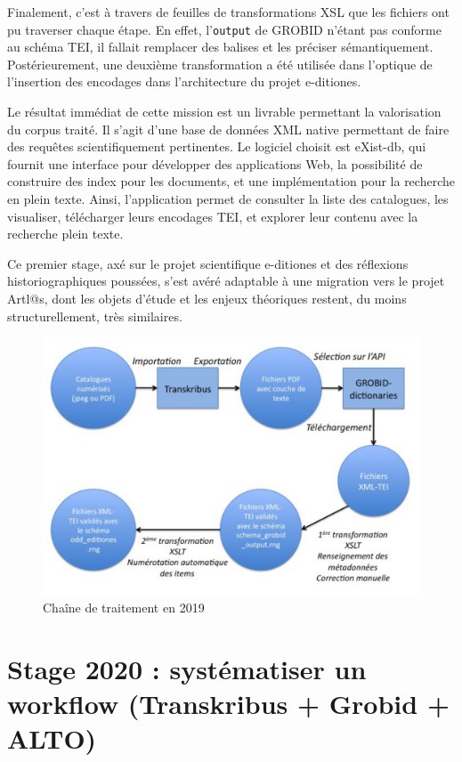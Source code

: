 \documentclass[a4paper,12pt,twoside]{book}
\begin{document}
Finalement, c'est à travers de feuilles de transformations XSL que les fichiers ont pu traverser chaque étape. En effet, l'\texttt{output} de GROBID n'étant pas conforme au schéma TEI, il fallait remplacer des balises et les préciser sémantiquement. Postérieurement, une deuxième transformation a été utilisée dans l'optique de l'insertion des encodages dans l'architecture du projet e-ditiones.

Le résultat immédiat de cette mission est un livrable permettant la valorisation du corpus traité. Il s'agit d'une base de données XML native permettant de faire des requêtes scientifiquement pertinentes. Le logiciel choisit est eXist-db, qui fournit une interface pour développer des applications Web, la possibilité de construire des index pour les documents, et une implémentation pour la recherche en plein texte. Ainsi, l'application permet de consulter la liste des catalogues, les visualiser, télécharger leurs encodages TEI, et explorer leur contenu avec la recherche plein texte. 

Ce premier stage, axé sur le projet scientifique e-ditiones et des réflexions historiographiques poussées, s'est avéré adaptable à une migration vers le projet Artl@s, dont les objets d'étude et les enjeux théoriques restent, du moins structurellement, très similaires. 
\begin{figure}
  	\centering
	\includegraphics[scale=0.6]{chaine2019}
	\caption{Chaîne de traitement en 2019}
	\label{2019}
\end{figure}


\section{Stage 2020 : systématiser un workflow (Transkribus + Grobid + ALTO)}
\end{document}
